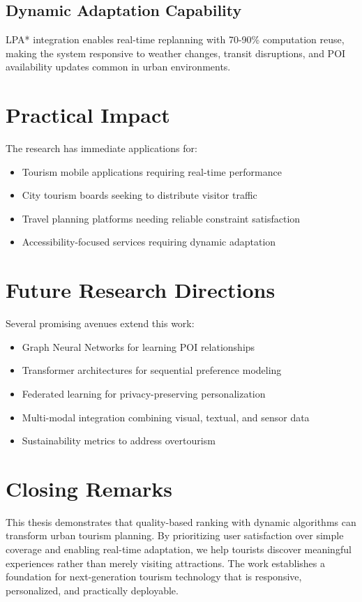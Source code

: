 \documentclass[12pt,a4paper,twoside]{report}
\theoremstyle{definition}
\begin{document}
\subsection{Dynamic Adaptation Capability}
LPA* integration enables real-time replanning with 70-90\% computation reuse, making the system responsive to weather changes, transit disruptions, and POI availability updates common in urban environments.

\section{Practical Impact}
The research has immediate applications for:
\begin{itemize}
    \item Tourism mobile applications requiring real-time performance
    \item City tourism boards seeking to distribute visitor traffic
    \item Travel planning platforms needing reliable constraint satisfaction
    \item Accessibility-focused services requiring dynamic adaptation
\end{itemize}

\section{Future Research Directions}
Several promising avenues extend this work:
\begin{itemize}
    \item Graph Neural Networks for learning POI relationships
    \item Transformer architectures for sequential preference modeling
    \item Federated learning for privacy-preserving personalization
    \item Multi-modal integration combining visual, textual, and sensor data
    \item Sustainability metrics to address overtourism
\end{itemize}

\section{Closing Remarks}
This thesis demonstrates that quality-based ranking with dynamic algorithms can transform urban tourism planning. By prioritizing user satisfaction over simple coverage and enabling real-time adaptation, we help tourists discover meaningful experiences rather than merely visiting attractions. The work establishes a foundation for next-generation tourism technology that is responsive, personalized, and practically deployable.
\end{document}
